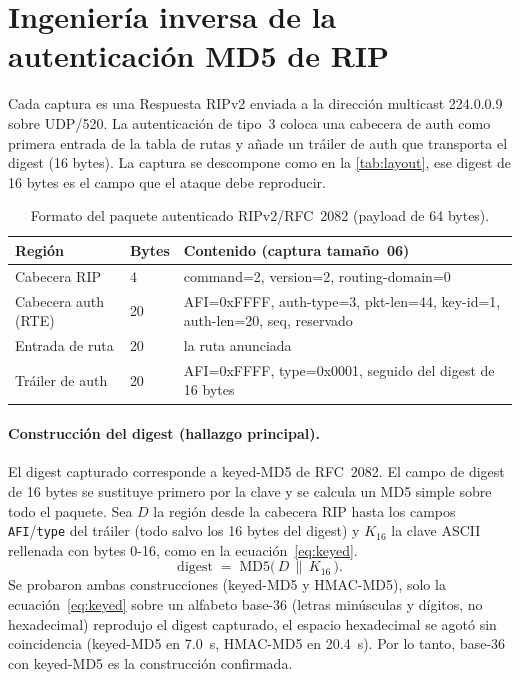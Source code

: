 \section{Ingeniería inversa de la autenticación MD5 de RIP}\label{sec:reveng}
Cada captura es una Respuesta RIPv2 enviada a la dirección multicast 224.0.0.9 sobre UDP/520. La autenticación de tipo~3 coloca una cabecera de auth como primera entrada de la tabla de rutas y añade un tráiler de auth que transporta el digest (16 bytes). La captura se descompone como en la \autoref{tab:layout}, ese digest de 16 bytes es el campo que el ataque debe reproducir.

\begin{table}[H]
\centering
\footnotesize
\begin{tabularx}{\linewidth}{l l X}
\hline
\textbf{Región} & \textbf{Bytes} & \textbf{Contenido (captura tamaño~06)}\\
\hline
Cabecera RIP        & 4  & command=2, version=2, routing-domain=0\\
Cabecera auth (RTE) & 20 & AFI=0xFFFF, auth-type=3, pkt-len=44, key-id=1, auth-len=20, seq, reservado\\
Entrada de ruta     & 20 & la ruta anunciada\\
Tráiler de auth     & 20 & AFI=0xFFFF, type=0x0001, seguido del digest de 16 bytes\\
\hline
\end{tabularx}
\caption{Formato del paquete autenticado RIPv2/RFC~2082 (payload de 64 bytes).}
\label{tab:layout}
\end{table}

\paragraph{Construcción del digest (hallazgo principal).} El digest capturado corresponde a keyed-MD5 de RFC~2082. El campo de digest de 16 bytes se sustituye primero por la clave y se calcula un MD5 simple sobre todo el paquete. Sea $D$ la región desde la cabecera RIP hasta los campos \texttt{AFI}/\texttt{type} del tráiler (todo salvo los 16 bytes del digest) y $K_{16}$ la clave ASCII rellenada con bytes 0-16, como en la ecuación~\eqref{eq:keyed}.
\begin{equation}
\text{digest} \;=\; \mathrm{MD5}\bigl(\, D \,\|\, K_{16} \,\bigr).
\label{eq:keyed}
\end{equation}
Se probaron ambas construcciones (keyed-MD5 y HMAC-MD5), solo la ecuación~\eqref{eq:keyed} sobre un alfabeto base-36 (letras minúsculas y dígitos, no hexadecimal) reprodujo el digest capturado, el espacio hexadecimal se agotó sin coincidencia (keyed-MD5 en 7.0~s, HMAC-MD5 en 20.4~s). Por lo tanto, base-36 con keyed-MD5 es la construcción confirmada.

